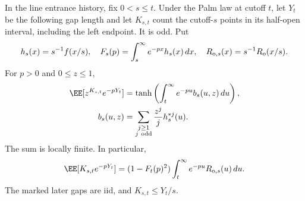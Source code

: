 \documentclass[11pt,letterpaper]{article}
\begin{document}
\begin{proposition}
\label{prop:two-time-gap-transform}
In the line entrance history, fix $0<s\le t$. Under the Palm
law at cutoff $t$, let $Y_t$ be the following gap length and
let $K_{s,t}$ count the cutoff-$s$ points in its half-open
interval, including the left endpoint. It is odd. Put
\[
 h_s(x)=s^{-1}f(x/s),\quad
 F_s(p)=\int_s^\infty e^{-px}h_s(x)\,dx,
 \quad R_{{\rm o},s}(x)=s^{-1}R_{\rm o}(x/s).
\]
For $p>0$ and $0\le z\le1$,
\begin{align}
 \EE[z^{K_{s,t}}e^{-pY_t}]
  &=\tanh\left(\int_t^\infty e^{-pu}b_s(u,z)\,du\right),
       \label{eq:two-time-marked-gap-transform}\\
 b_s(u,z)&=\sum_{\substack{j\ge1\\j\ {\rm odd}}}
                   \frac{z^j}{j}h_s^{*j}(u).\nonumber
\end{align}
The sum is locally finite. In particular,
\begin{equation}\label{eq:two-time-gap-first-mark}
 \EE[K_{s,t}e^{-pY_t}]
   =(1-F_t(p)^2)\int_t^\infty e^{-pu}R_{{\rm o},s}(u)\,du.
\end{equation}
The marked later gaps are iid, and $K_{s,t}\le Y_t/s$.
\end{proposition}
\end{document}
